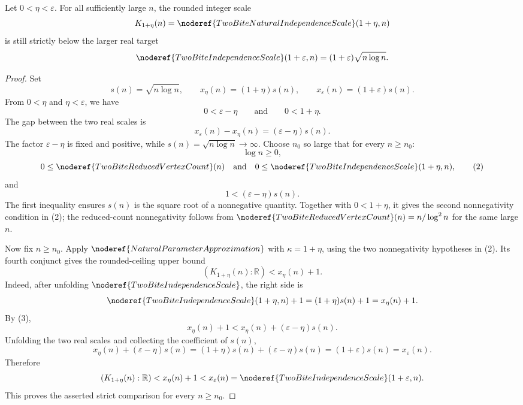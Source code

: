 \begin{lemma}
Let \(0<\eta<\varepsilon\).  For all sufficiently large \(n\), the rounded
integer scale
\[
K_{1+\eta}(n)=
\noderef{TwoBiteNaturalIndependenceScale}(1+\eta,n)
\]
is still strictly below the larger real target
\[
\noderef{TwoBiteIndependenceScale}(1+\varepsilon,n)
=(1+\varepsilon)\sqrt{n\log n}.
\]
\end{lemma}
\begin{proof}
Set
\[
s(n)=\sqrt{n\log n},\qquad
x_\eta(n)=(1+\eta)s(n),\qquad
x_\varepsilon(n)=(1+\varepsilon)s(n).
\]
From \(0<\eta\) and \(\eta<\varepsilon\), we have
\[
0<\varepsilon-\eta
\qquad\text{and}\qquad
0<1+\eta.
\]
The gap between the two real scales is
\[
x_\varepsilon(n)-x_\eta(n)
=(\varepsilon-\eta)s(n).
\]
The factor \(\varepsilon-\eta\) is fixed and positive, while
\(s(n)=\sqrt{n\log n}\to\infty\).  Choose \(n_0\) so large that for every
\(n\ge n_0\):
\[
\log n\ge0, \tag{1}
\]
\[
0\le \noderef{TwoBiteReducedVertexCount}(n)
\quad\text{and}\quad
0\le \noderef{TwoBiteIndependenceScale}(1+\eta,n), \tag{2}
\]
and
\[
1<(\varepsilon-\eta)s(n). \tag{3}
\]
The first inequality ensures \(s(n)\) is the square root of a nonnegative
quantity.  Together with \(0<1+\eta\), it gives the second nonnegativity
condition in (2); the reduced-count nonnegativity follows from
\(\noderef{TwoBiteReducedVertexCount}(n)=n/\log^2 n\) for the same large \(n\).

Now fix \(n\ge n_0\).  Apply \(\noderef{NaturalParameterApproximation}\) with
\(\kappa=1+\eta\), using the two nonnegativity hypotheses in (2).  Its fourth
conjunct gives the rounded-ceiling upper bound
\[
(K_{1+\eta}(n):\mathbb R)<x_\eta(n)+1.
\]
Indeed, after unfolding \(\noderef{TwoBiteIndependenceScale}\), the right side
is
\[
\noderef{TwoBiteIndependenceScale}(1+\eta,n)+1
=(1+\eta)s(n)+1=x_\eta(n)+1.
\]
By (3),
\[
x_\eta(n)+1<x_\eta(n)+(\varepsilon-\eta)s(n).
\]
Unfolding the two real scales and collecting the coefficient of \(s(n)\),
\[
x_\eta(n)+(\varepsilon-\eta)s(n)
=(1+\eta)s(n)+(\varepsilon-\eta)s(n)
=(1+\varepsilon)s(n)
=x_\varepsilon(n).
\]
Therefore
\[
(K_{1+\eta}(n):\mathbb R)
<x_\eta(n)+1
<x_\varepsilon(n)
=\noderef{TwoBiteIndependenceScale}(1+\varepsilon,n).
\]
This proves the asserted strict comparison for every \(n\ge n_0\).
\end{proof}
